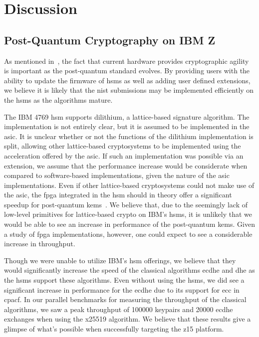 \chapter{Discussion}
\label{chapter:discussion}

\section{Post-Quantum Cryptography on IBM Z}

As mentioned in~\cite{microsoft2020, ibm:z15:2019}, the fact that current hardware provides cryptographic agility is important as the \gls{post-quantum} standard evolves. By providing users with the ability to update the firmware of \glspl{hsm} as well as adding user defined extensions, we believe it is likely that the \gls{nist} submissions may be implemented efficiently on the \glspl{hsm} as the algorithms mature.

The IBM 4769 \gls{hsm} supports \gls{dilithium}, a lattice-based signature algorithm. The implementation is not entirely clear, but it is assumed to be implemented in the \gls{asic}. It is unclear whether or not the functions of the \gls{dilithium} implementation is split, allowing other lattice-based cryptosystems to be implemented using the acceleration offered by the \gls{asic}. If such an implementation was possible via an extension, we assume that the performance increase would be considerate when compared to software-based implementations, given the nature of the \gls{asic} implementations. Even if other lattice-based cryptosystems could not make use of the \gls{asic}, the \gls{fpga} integrated in the \gls{hsm} should in theory offer a significant speedup for \gls{post-quantum} \glspl{kem}~\cite{zhu2021, roy2020}. We believe that, due to the seemingly lack of low-level primitives for lattice-based crypto on IBM's \glspl{hsm}, it is unlikely that we would be able to see an increase in performance of the \gls{post-quantum} \glspl{kem}. Given a study of \gls{fpga} implementations, however, one could expect to see a considerable increase in throughput.

Though we were unable to utilize IBM's \gls{hsm} offerings, we believe that they would significantly increase the speed of the classical algorithms \gls{ecdhe} and \gls{dhe} as the \glspl{hsm} support these algorithms. Even without using the \glspl{hsm}, we did see a significant increase in performance for the \gls{ecdhe} due to its support for \gls{ecc} in \gls{cpacf}. In our parallel benchmarks for measuring the throughput of the classical algorithms, we saw a peak throughput of 100000 keypairs and 20000 \gls{ecdhe} exchanges when using the \gls{x25519} algorithm. We believe that these results give a glimpse of what's possible when successfully targeting the \gls{z15} platform. 


